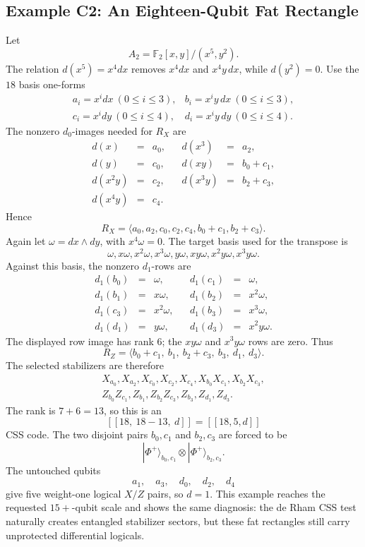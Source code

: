 \subsection{Example C2: An Eighteen-Qubit Fat Rectangle}
Let
\[
  A_2=\mathbb F_2[x,y]/(x^5,y^2).
\]
The relation \(d(x^5)=x^4dx\) removes \(x^4dx\) and \(x^4y\,dx\), while
\(d(y^2)=0\).  Use the \(18\) basis one-forms
\[
\begin{array}{llll}
a_i=x^i dx\ (0\le i\le3),&
b_i=x^iy\,dx\ (0\le i\le3),\\
c_i=x^i dy\ (0\le i\le4),&
d_i=x^iy\,dy\ (0\le i\le4).
\end{array}
\]
The nonzero \(d_0\)-images needed for \(R_X\) are
\[
\begin{array}{rclcrcl}
d(x)&=&a_0,&&d(x^3)&=&a_2,\\
d(y)&=&c_0,&&d(xy)&=&b_0+c_1,\\
d(x^2y)&=&c_2,&&d(x^3y)&=&b_2+c_3,\\
d(x^4y)&=&c_4.&&&
\end{array}
\]
Hence
\[
  R_X=\langle a_0,a_2,c_0,c_2,c_4,b_0+c_1,b_2+c_3\rangle.
\]
Again let \(\omega=dx\wedge dy\), with \(x^4\omega=0\).  The target basis used
for the transpose is
\[
  \omega,x\omega,x^2\omega,x^3\omega,
  y\omega,xy\omega,x^2y\omega,x^3y\omega.
\]
Against this basis, the nonzero \(d_1\)-rows are
\[
\begin{array}{rclcrcl}
d_1(b_0)&=&\omega,&&d_1(c_1)&=&\omega,\\
d_1(b_1)&=&x\omega,&&d_1(b_2)&=&x^2\omega,\\
d_1(c_3)&=&x^2\omega,&&d_1(b_3)&=&x^3\omega,\\
d_1(d_1)&=&y\omega,&&d_1(d_3)&=&x^2y\omega.
\end{array}
\]
The displayed row image has rank \(6\); the \(xy\omega\) and \(x^3y\omega\)
rows are zero.
Thus
\[
  R_Z=\langle b_0+c_1,\ b_1,\ b_2+c_3,\ b_3,\ d_1,\ d_3\rangle.
\]
The selected stabilizers are therefore
\[
\begin{array}{l}
X_{a_0},X_{a_2},X_{c_0},X_{c_2},X_{c_4},
X_{b_0}X_{c_1},X_{b_2}X_{c_3},\\
Z_{b_0}Z_{c_1},Z_{b_1},Z_{b_2}Z_{c_3},Z_{b_3},Z_{d_1},Z_{d_3}.
\end{array}
\]
The rank is \(7+6=13\), so this is an
\[
  [[18,\ 18-13,\ d]]=[[18,5,d]]
\]
CSS code.  The two disjoint pairs \(b_0,c_1\) and \(b_2,c_3\) are forced to be
\[
  |\Phi^+\rangle_{b_0,c_1}\otimes|\Phi^+\rangle_{b_2,c_3}.
\]
The untouched qubits
\[
  a_1,\quad a_3,\quad d_0,\quad d_2,\quad d_4
\]
give five weight-one logical \(X/Z\) pairs, so \(d=1\).  This example reaches
the requested \(15+\)-qubit scale and shows the same diagnosis: the de Rham
CSS test naturally creates entangled stabilizer sectors, but these fat
rectangles still carry unprotected differential logicals.
